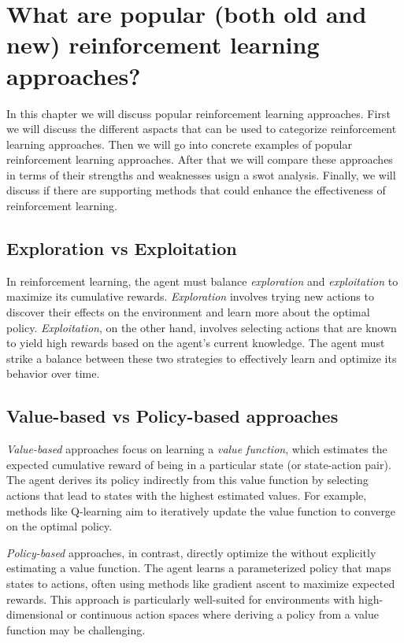 \section{What are popular (both old and new) reinforcement learning approaches?  }

In this chapter we will discuss popular reinforcement learning approaches. 
First we will discuss the different aspacts that can be used to categorize reinforcement learning approaches. 
Then we will go into concrete examples of popular reinforcement learning approaches.
After that we will compare these approaches in terms of their strengths and weaknesses usign a \gls{swot} analysis.
Finally, we will discuss if there are supporting methods that could enhance the effectiveness of reinforcement learning.

\subsection{Exploration vs Exploitation}

In reinforcement learning, the \gls{agent} must balance \emph{exploration} and \emph{exploitation} to maximize its cumulative rewards. \emph{Exploration} involves trying new actions to discover their effects on the environment and learn more about the optimal \gls{policy}. \emph{Exploitation}, on the other hand, involves selecting actions that are known to yield high rewards based on the \gls{agent}'s current knowledge. The \gls{agent} must strike a balance between these two strategies to effectively learn and optimize its behavior over time.

\subsection{Value-based vs Policy-based approaches}

\emph{Value-based} approaches focus on learning a \emph{value function}, which estimates the expected cumulative reward of being in a particular state (or state-action pair). The \gls{agent} derives its \gls{policy} indirectly from this value function by selecting actions that lead to states with the highest estimated values. For example, methods like Q-learning aim to iteratively update the value function to converge on the optimal \gls{policy}.

\emph{Policy-based} approaches, in contrast, directly optimize the without explicitly estimating a value function. The \gls{agent} learns a parameterized \gls{policy} that maps states to actions, often using methods like gradient ascent to maximize expected rewards. This approach is particularly well-suited for environments with high-dimensional or continuous action spaces where deriving a \gls{policy} from a value function may be challenging.

